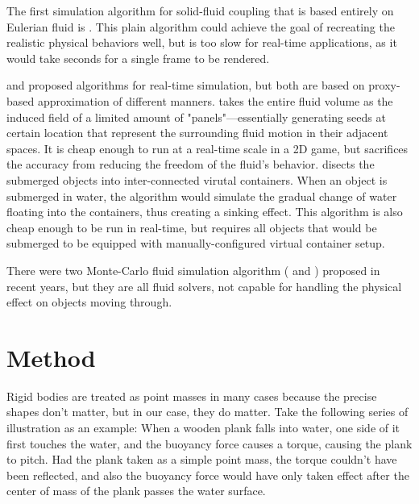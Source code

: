 \documentclass{article}
\begin{document}
The first simulation algorithm for solid-fluid coupling that is based entirely on Eulerian fluid is \cite{teng2016eulerian}.
This plain algorithm could achieve the goal of recreating the realistic physical behaviors well, but is too slow for real-time applications, as it would take seconds for a single frame to be rendered.

\cite{GER13} and \cite{BAJ20} proposed algorithms for real-time simulation, but both are based on proxy-based approximation of different manners.
\cite{GER13} takes the entire fluid volume as the induced field of a
limited amount of "panels"---essentially generating seeds at certain location that represent the surrounding fluid motion in their adjacent spaces.
It is cheap enough to run at a real-time scale in a 2D game, but sacrifices the accuracy from reducing the freedom of the fluid’s behavior.
\cite{BAJ20} disects the submerged objects into inter-connected virutal containers.
When an object is submerged in water, the algorithm would simulate the gradual change of water floating into the containers, thus creating a sinking effect.
This algorithm is also cheap enough to be run in real-time, but requires all objects that would be submerged to be equipped with manually-configured virtual container setup.

There were two Monte-Carlo fluid simulation algorithm (\cite{sugimoto2024velocity} and \cite{rioux2022monte}) proposed in recent years, but they are all fluid solvers, not capable for handling the physical effect on objects moving through.

\section{Method}

Rigid bodies are treated as point masses in many cases because the precise shapes don't matter, but in our case, they do matter.
Take the following series of illustration as an example:
When a wooden plank falls into water, one side of it first touches the water, and the buoyancy force causes a torque, causing the plank to pitch.
Had the plank taken as a simple point mass, the torque couldn't have been reflected, and also the buoyancy force would have only taken effect after the center of mass of the plank passes the water surface.
\end{document}
